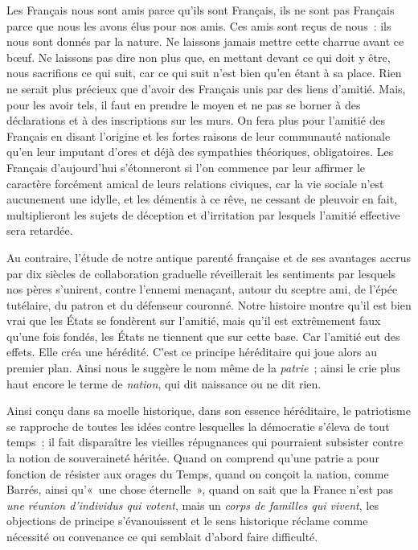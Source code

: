 \documentclass[french,twoside]{book} %
\newcommand{\astermono}{\medskip\centerline{\color{rubric}\large\selectfont{\syms ✻}}\medskip\par}%
\begin{document}
\astermono

\noindent Les Français nous sont amis parce qu’ils sont Français, ils ne sont pas Français parce que nous les avons élus pour nos amis. Ces amis sont reçus de nous : ils nous sont donnés par la nature. Ne laissons jamais mettre cette charrue avant ce bœuf. Ne laissons pas dire non plus que, en mettant devant ce qui doit y être, nous sacrifions ce qui suit, car ce qui suit n’est bien qu’en étant à sa place. Rien ne serait plus précieux que d’avoir des Français unis par des liens d’amitié. Mais, pour les avoir tels, il faut en prendre le moyen et ne pas se borner à des déclarations et à des inscriptions sur les murs. On fera plus pour l’amitié des Français en disant l’origine et les fortes raisons de leur communauté nationale qu’en leur imputant d’ores et déjà des sympathies théoriques, obligatoires. Les Français d’aujourd’hui s’étonneront si l’on commence par leur affirmer le caractère forcément amical de leurs relations civiques, car la vie sociale n’est aucunement une idylle, et les démentis à ce rêve, ne cessant de pleuvoir en fait, multiplieront les sujets de déception et d’irritation par lesquels l’amitié effective sera retardée.\par

\astermono

\noindent Au contraire, l’étude de notre antique parenté française et de ses avantages accrus par dix siècles de collaboration graduelle réveillerait les sentiments par lesquels nos pères s’unirent, contre l’ennemi menaçant, autour du sceptre ami, de l’épée tutélaire, du patron et du défenseur couronné. Notre histoire montre qu’il est bien vrai que les États se fondèrent sur l’amitié, mais qu’il est extrêmement faux qu’une fois fondés, les États ne tiennent que sur cette base. Car l’amitié eut des effets. Elle créa une hérédité. C’est ce principe héréditaire qui joue alors au premier plan. Ainsi nous le suggère le nom même de la \emph{patrie} ; ainsi le crie plus haut encore le terme de \emph{nation}, qui dit naissance ou ne dit rien.\par
Ainsi conçu dans sa moelle historique, dans son essence héréditaire, le patriotisme se rapproche de toutes les idées contre lesquelles la démocratie s’éleva de tout temps ; il fait disparaître les vieilles répugnances qui pourraient subsister contre la notion de souveraineté héritée. Quand on comprend qu’une patrie a pour fonction de résister aux orages du Temps, quand on conçoit la nation, comme Barrés, ainsi qu’« une chose éternelle », quand on sait que la France n’est pas \emph{une réunion d’individus qui votent}, mais un \emph{corps de familles qui vivent}, les objections de principe s’évanouissent et le sens historique réclame comme nécessité ou convenance ce qui semblait d’abord faire difficulté.\par
\end{document}
